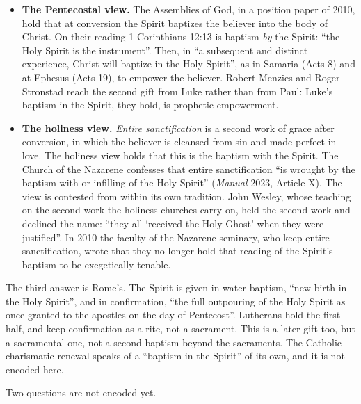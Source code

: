 \documentclass[11pt]{article}
\begin{document}
\begin{itemize}
  \item \textbf{The Pentecostal view.} The Assemblies of God, in a position paper of 2010, hold that at conversion the Spirit baptizes the believer into the body of Christ. On their reading 1 Corinthians 12:13 is baptism \emph{by} the Spirit: “the Holy Spirit is the instrument”. Then, in “a subsequent and distinct experience, Christ will baptize in the Holy Spirit”, as in Samaria (Acts 8) and at Ephesus (Acts 19), to empower the believer. Robert Menzies and Roger Stronstad reach the second gift from Luke rather than from Paul: Luke’s baptism in the Spirit, they hold, is prophetic empowerment.
  \item \textbf{The holiness view.} \emph{Entire sanctification} is a second work of grace after conversion, in which the believer is cleansed from sin and made perfect in love. The holiness view holds that this is the baptism with the Spirit. The Church of the Nazarene confesses that entire sanctification “is wrought by the baptism with or infilling of the Holy Spirit” (\emph{Manual} 2023, Article X). The view is contested from within its own tradition. John Wesley, whose teaching on the second work the holiness churches carry on, held the second work and declined the name: “they all ‘received the Holy Ghost’ when they were justified”. In 2010 the faculty of the Nazarene seminary, who keep entire sanctification, wrote that they no longer hold that reading of the Spirit’s baptism to be exegetically tenable.
\end{itemize}
The third answer is Rome’s. The Spirit is given in water baptism, “new birth in the Holy Spirit”, and in confirmation, “the full outpouring of the Holy Spirit as once granted to the apostles on the day of Pentecost”. Lutherans hold the first half, and keep confirmation as a rite, not a sacrament. This is a later gift too, but a sacramental one, not a second baptism beyond the sacraments. The Catholic charismatic renewal speaks of a “baptism in the Spirit” of its own, and it is not encoded here.

Two questions are not encoded yet.
\end{document}
